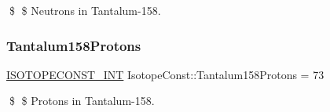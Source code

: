 \$ \$ Neutrons in Tantalum-\/158. \mbox{\label{group___isotope_const-_tantalum-_ta158_ga66fed3694e4166d6c9a9f4445b05c792}} 
\subsubsection{\texorpdfstring{Tantalum158\+Protons}{Tantalum158Protons}}
{\footnotesize\ttfamily \mbox{\hyperlink{group___isotope_const-_macros_ga5f18360b3e99483a35c32d789e62621c}{I\+S\+O\+T\+O\+P\+E\+C\+O\+N\+S\+T\+\_\+\+I\+NT}} Isotope\+Const\+::\+Tantalum158\+Protons = 73}

\$ \$ Protons in Tantalum-\/158. 